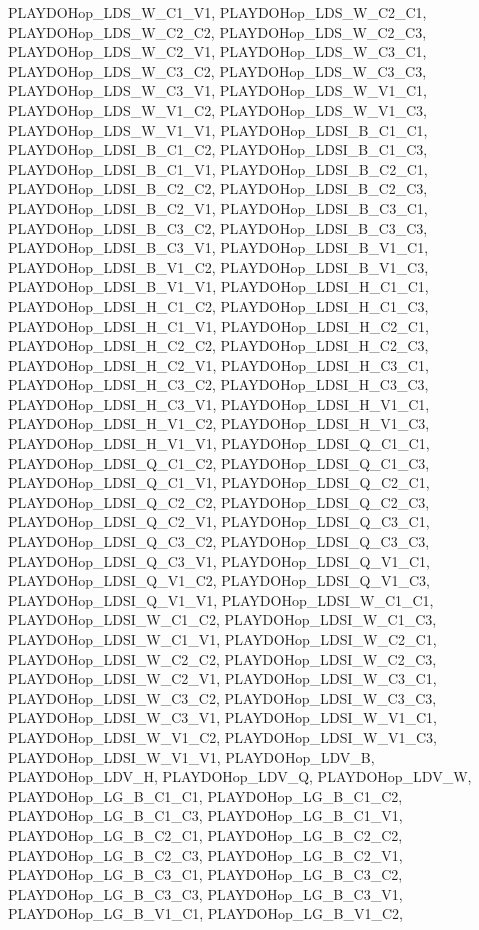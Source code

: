 PLAYDOHop\_\-LDS\_\-W\_\-C1\_\-V1, PLAYDOHop\_\-LDS\_\-W\_\-C2\_\-C1, PLAYDOHop\_\-LDS\_\-W\_\-C2\_\-C2, PLAYDOHop\_\-LDS\_\-W\_\-C2\_\-C3, PLAYDOHop\_\-LDS\_\-W\_\-C2\_\-V1, PLAYDOHop\_\-LDS\_\-W\_\-C3\_\-C1, PLAYDOHop\_\-LDS\_\-W\_\-C3\_\-C2, PLAYDOHop\_\-LDS\_\-W\_\-C3\_\-C3, PLAYDOHop\_\-LDS\_\-W\_\-C3\_\-V1, PLAYDOHop\_\-LDS\_\-W\_\-V1\_\-C1, PLAYDOHop\_\-LDS\_\-W\_\-V1\_\-C2, PLAYDOHop\_\-LDS\_\-W\_\-V1\_\-C3, PLAYDOHop\_\-LDS\_\-W\_\-V1\_\-V1, PLAYDOHop\_\-LDSI\_\-B\_\-C1\_\-C1, PLAYDOHop\_\-LDSI\_\-B\_\-C1\_\-C2, PLAYDOHop\_\-LDSI\_\-B\_\-C1\_\-C3, PLAYDOHop\_\-LDSI\_\-B\_\-C1\_\-V1, PLAYDOHop\_\-LDSI\_\-B\_\-C2\_\-C1, PLAYDOHop\_\-LDSI\_\-B\_\-C2\_\-C2, PLAYDOHop\_\-LDSI\_\-B\_\-C2\_\-C3, PLAYDOHop\_\-LDSI\_\-B\_\-C2\_\-V1, PLAYDOHop\_\-LDSI\_\-B\_\-C3\_\-C1, PLAYDOHop\_\-LDSI\_\-B\_\-C3\_\-C2, PLAYDOHop\_\-LDSI\_\-B\_\-C3\_\-C3, PLAYDOHop\_\-LDSI\_\-B\_\-C3\_\-V1, PLAYDOHop\_\-LDSI\_\-B\_\-V1\_\-C1, PLAYDOHop\_\-LDSI\_\-B\_\-V1\_\-C2, PLAYDOHop\_\-LDSI\_\-B\_\-V1\_\-C3, PLAYDOHop\_\-LDSI\_\-B\_\-V1\_\-V1, PLAYDOHop\_\-LDSI\_\-H\_\-C1\_\-C1, PLAYDOHop\_\-LDSI\_\-H\_\-C1\_\-C2, PLAYDOHop\_\-LDSI\_\-H\_\-C1\_\-C3, PLAYDOHop\_\-LDSI\_\-H\_\-C1\_\-V1, PLAYDOHop\_\-LDSI\_\-H\_\-C2\_\-C1, PLAYDOHop\_\-LDSI\_\-H\_\-C2\_\-C2, PLAYDOHop\_\-LDSI\_\-H\_\-C2\_\-C3, PLAYDOHop\_\-LDSI\_\-H\_\-C2\_\-V1, PLAYDOHop\_\-LDSI\_\-H\_\-C3\_\-C1, PLAYDOHop\_\-LDSI\_\-H\_\-C3\_\-C2, PLAYDOHop\_\-LDSI\_\-H\_\-C3\_\-C3, PLAYDOHop\_\-LDSI\_\-H\_\-C3\_\-V1, PLAYDOHop\_\-LDSI\_\-H\_\-V1\_\-C1, PLAYDOHop\_\-LDSI\_\-H\_\-V1\_\-C2, PLAYDOHop\_\-LDSI\_\-H\_\-V1\_\-C3, PLAYDOHop\_\-LDSI\_\-H\_\-V1\_\-V1, PLAYDOHop\_\-LDSI\_\-Q\_\-C1\_\-C1, PLAYDOHop\_\-LDSI\_\-Q\_\-C1\_\-C2, PLAYDOHop\_\-LDSI\_\-Q\_\-C1\_\-C3, PLAYDOHop\_\-LDSI\_\-Q\_\-C1\_\-V1, PLAYDOHop\_\-LDSI\_\-Q\_\-C2\_\-C1, PLAYDOHop\_\-LDSI\_\-Q\_\-C2\_\-C2, PLAYDOHop\_\-LDSI\_\-Q\_\-C2\_\-C3, PLAYDOHop\_\-LDSI\_\-Q\_\-C2\_\-V1, PLAYDOHop\_\-LDSI\_\-Q\_\-C3\_\-C1, PLAYDOHop\_\-LDSI\_\-Q\_\-C3\_\-C2, PLAYDOHop\_\-LDSI\_\-Q\_\-C3\_\-C3, PLAYDOHop\_\-LDSI\_\-Q\_\-C3\_\-V1, PLAYDOHop\_\-LDSI\_\-Q\_\-V1\_\-C1, PLAYDOHop\_\-LDSI\_\-Q\_\-V1\_\-C2, PLAYDOHop\_\-LDSI\_\-Q\_\-V1\_\-C3, PLAYDOHop\_\-LDSI\_\-Q\_\-V1\_\-V1, PLAYDOHop\_\-LDSI\_\-W\_\-C1\_\-C1, PLAYDOHop\_\-LDSI\_\-W\_\-C1\_\-C2, PLAYDOHop\_\-LDSI\_\-W\_\-C1\_\-C3, PLAYDOHop\_\-LDSI\_\-W\_\-C1\_\-V1, PLAYDOHop\_\-LDSI\_\-W\_\-C2\_\-C1, PLAYDOHop\_\-LDSI\_\-W\_\-C2\_\-C2, PLAYDOHop\_\-LDSI\_\-W\_\-C2\_\-C3, PLAYDOHop\_\-LDSI\_\-W\_\-C2\_\-V1, PLAYDOHop\_\-LDSI\_\-W\_\-C3\_\-C1, PLAYDOHop\_\-LDSI\_\-W\_\-C3\_\-C2, PLAYDOHop\_\-LDSI\_\-W\_\-C3\_\-C3, PLAYDOHop\_\-LDSI\_\-W\_\-C3\_\-V1, PLAYDOHop\_\-LDSI\_\-W\_\-V1\_\-C1, PLAYDOHop\_\-LDSI\_\-W\_\-V1\_\-C2, PLAYDOHop\_\-LDSI\_\-W\_\-V1\_\-C3, PLAYDOHop\_\-LDSI\_\-W\_\-V1\_\-V1, PLAYDOHop\_\-LDV\_\-B, PLAYDOHop\_\-LDV\_\-H, PLAYDOHop\_\-LDV\_\-Q, PLAYDOHop\_\-LDV\_\-W, PLAYDOHop\_\-LG\_\-B\_\-C1\_\-C1, PLAYDOHop\_\-LG\_\-B\_\-C1\_\-C2, PLAYDOHop\_\-LG\_\-B\_\-C1\_\-C3, PLAYDOHop\_\-LG\_\-B\_\-C1\_\-V1, PLAYDOHop\_\-LG\_\-B\_\-C2\_\-C1, PLAYDOHop\_\-LG\_\-B\_\-C2\_\-C2, PLAYDOHop\_\-LG\_\-B\_\-C2\_\-C3, PLAYDOHop\_\-LG\_\-B\_\-C2\_\-V1, PLAYDOHop\_\-LG\_\-B\_\-C3\_\-C1, PLAYDOHop\_\-LG\_\-B\_\-C3\_\-C2, PLAYDOHop\_\-LG\_\-B\_\-C3\_\-C3, PLAYDOHop\_\-LG\_\-B\_\-C3\_\-V1, PLAYDOHop\_\-LG\_\-B\_\-V1\_\-C1, PLAYDOHop\_\-LG\_\-B\_\-V1\_\-C2, 